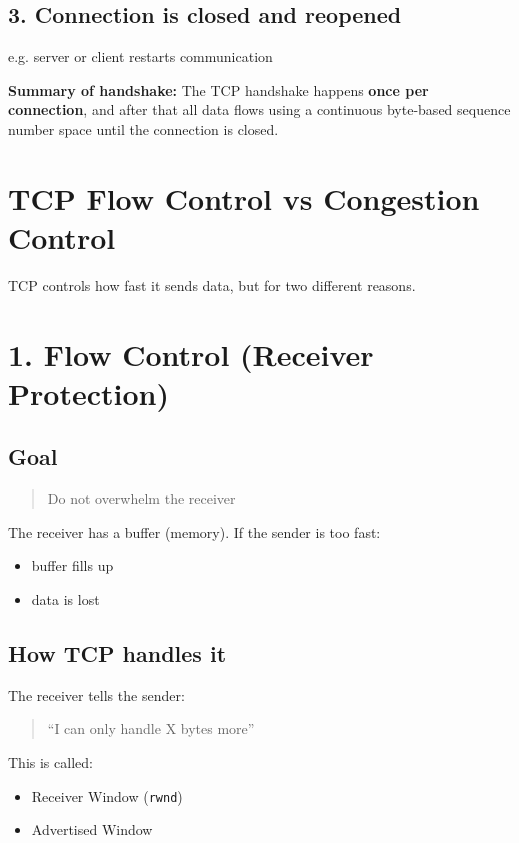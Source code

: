 \subsection{3. Connection is closed and reopened}
e.g. server or client restarts communication


\begin{notebox}
\textbf{Summary of handshake:}
The TCP handshake happens \textbf{once per connection}, and after that all data flows using a continuous byte-based sequence number space until the connection is closed.
\end{notebox}



\section{TCP Flow Control vs Congestion Control}

TCP controls how fast it sends data, but for two different reasons.

\section{1. Flow Control (Receiver Protection)}

\subsection*{Goal}

\begin{quote}
Do not overwhelm the receiver
\end{quote}

The receiver has a buffer (memory). If the sender is too fast:
\begin{itemize}
    \item buffer fills up
    \item data is lost
\end{itemize}

\subsection*{How TCP handles it}

The receiver tells the sender:

\begin{quote}
“I can only handle X bytes more”
\end{quote}

This is called:
\begin{itemize}
    \item Receiver Window (\texttt{rwnd})
    \item Advertised Window
\end{itemize}

